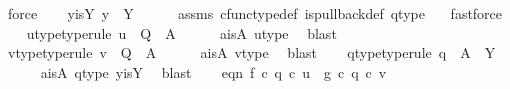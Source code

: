 \begin{isabellebody}
\ force\isanewline
\ \ \isamarkupfalse%
\ y{\isacharunderscore}{\kern0pt}is{\isacharunderscore}{\kern0pt}Y{\isacharcolon}{\kern0pt}\ {\isachardoublequoteopen}y\ {\isacharequal}{\kern0pt}\ Y{\isachardoublequoteclose}\isanewline
\ \ \ \ \isamarkupfalse%
\ assms{\isacharparenleft}{\kern0pt}{}{\isacharparenright}{\kern0pt}\ cfunc{\isacharunderscore}{\kern0pt}type{\isacharunderscore}{\kern0pt}def\ is{\isacharunderscore}{\kern0pt}pullback{\isacharunderscore}{\kern0pt}def\ q{}{\isacharunderscore}{\kern0pt}type\ \ \isamarkupfalse%
\ fastforce\isanewline
\ \ \isamarkupfalse%
\ u{\isacharunderscore}{\kern0pt}type{}{\isacharbrackleft}{\kern0pt}type{\isacharunderscore}{\kern0pt}rule{\isacharbrackright}{\kern0pt}{\isacharcolon}{\kern0pt}\ {\isachardoublequoteopen}u\ {\isacharcolon}{\kern0pt}\ Q\ {\isasymrightarrow}\ A{\isachardoublequoteclose}\isanewline
\ \ \ \ \isamarkupfalse%
\ a{\isacharunderscore}{\kern0pt}is{\isacharunderscore}{\kern0pt}A\ u{\isacharunderscore}{\kern0pt}type\ \isamarkupfalse%
\ blast\isanewline
\ \ \isamarkupfalse%
\ v{\isacharunderscore}{\kern0pt}type{}{\isacharbrackleft}{\kern0pt}type{\isacharunderscore}{\kern0pt}rule{\isacharbrackright}{\kern0pt}{\isacharcolon}{\kern0pt}\ {\isachardoublequoteopen}v\ {\isacharcolon}{\kern0pt}\ Q\ {\isasymrightarrow}\ A{\isachardoublequoteclose}\isanewline
\ \ \ \ \isamarkupfalse%
\ a{\isacharunderscore}{\kern0pt}is{\isacharunderscore}{\kern0pt}A\ v{\isacharunderscore}{\kern0pt}type\ \isamarkupfalse%
\ blast\isanewline
\ \ \isamarkupfalse%
\ q{}{\isacharunderscore}{\kern0pt}type{}{\isacharbrackleft}{\kern0pt}type{\isacharunderscore}{\kern0pt}rule{\isacharbrackright}{\kern0pt}{\isacharcolon}{\kern0pt}\ {\isachardoublequoteopen}q{}\ {\isacharcolon}{\kern0pt}\ A\ {\isasymrightarrow}\ Y{\isachardoublequoteclose}\isanewline
\ \ \ \ \isamarkupfalse%
\ a{\isacharunderscore}{\kern0pt}is{\isacharunderscore}{\kern0pt}A\ q{}{\isacharunderscore}{\kern0pt}type\ y{\isacharunderscore}{\kern0pt}is{\isacharunderscore}{\kern0pt}Y\ \isamarkupfalse%
\ blast\isanewline
\isanewline
\ \ \isamarkupfalse%
\ eqn{}{\isacharcolon}{\kern0pt}\ {\isachardoublequoteopen}f\ {\isasymcirc}\isactrlsub c\ {\isacharparenleft}{\kern0pt}q{}\ {\isasymcirc}\isactrlsub c\ u{\isacharparenright}{\kern0pt}\ {\isacharequal}{\kern0pt}\ g\ {\isasymcirc}\isactrlsub c\ {\isacharparenleft}{\kern0pt}q{}\ {\isasymcirc}\isactrlsub c\ v{\isacharparenright}{\kern0pt}{\isachardoublequoteclose}\isanewline

\end{isabellebody}
